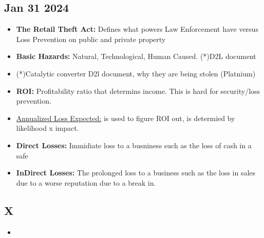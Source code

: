 \documentclass[12pt]{article}
\begin{document}
\subsection{Jan 31 2024}

\begin{itemize}
		  \item \textbf{The Retail Theft Act:} Defines what powers Law Enforcement have versus Loss Prevention on public
					 and private property
		  \item \textbf{Basic Hazards:} Natural, Technological, Human Caused. (*)D2L document
		  \item (*)Catalytic converter D2l document, why they are being stolen (Platnium)
		  \item \textbf{ROI:} Profitability ratio that determins income. This is hard for security/loss prevention. 
		  \item \underline{Annualized Loss Expected:} is used to figure ROI out, is determied by likelihood x impact. 
		  \item \textbf{Direct Losses:} Immidiate loss to a busniness such as the loss of cash in a safe
		  \item \textbf{InDirect Losses:} The prolonged loss to a business such as the loss in sales due to a 
					 worse reputation due to a break in. 
\end{itemize}

\subsection{X}

\begin{itemize}
		  \item 
\end{itemize}
\end{document}
